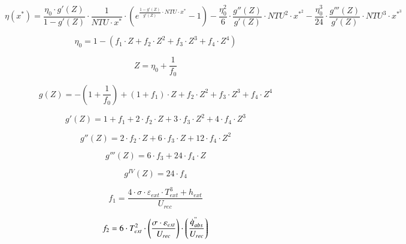 \documentclass[12pt]{report} %
\begin{document}
\begin{equation}
    \eta(x^{*}) = \frac{\eta_{0} \cdot g'(Z)}{1-g'(Z)} \cdot \frac{1}{NTU \cdot x^{*}} \cdot \left(e^{\frac{1-g'(Z)}{g'(Z)}\cdot NTU \cdot x^{*}} - 1\right) - \frac{\eta_{0}^2}{6} \cdot \frac{g''(Z)}{g'(Z)} \cdot NTU^{2} \cdot x^{*^{2}} - \frac{\eta_{0}^{3}}{24} \cdot \frac{g'''(Z)}{g'(Z)} \cdot NTU^{3} \cdot x^{*^{3}}
    \label{eq:modelocompleto}
\end{equation}

\begin{equation}
    \eta_{0} = 1 - (f_{1} \cdot Z + f_{2} \cdot Z^{2} + f_{3} \cdot Z^{3} + f_{4} \cdot Z^{4})
    \label{eq:rendimiento0}
\end{equation}

\begin{equation}
    Z = \eta_{0} + \frac{1}{f_{0}} 
    \label{eq:zeta}
\end{equation}

\begin{equation}
    g(Z) = -\left(1+\frac{1}{f_{0}}\right)+(1+f_{1})\cdot Z + f_{2}\cdot Z^{2} +  f_{3}\cdot Z^{3} + f_{4}\cdot Z^{4} 
    \label{eq:gdezeta}
\end{equation}

\begin{equation}
    g'(Z) = 1 + f_{1} + 2 \cdot f_{2} \cdot Z + 3 \cdot f_{3} \cdot Z^{2} + 4 \cdot f_{4} \cdot Z^{3} 
    \label{eq:gprimadezeta}
\end{equation}

\begin{equation}
    g''(Z) = 2 \cdot f_{2} \cdot Z + 6 \cdot f_{3} \cdot Z + 12 \cdot f_{4} \cdot Z^{2} 
    \label{eq:g2primadezeta}
\end{equation}

\begin{equation}
    g'''(Z) = 6 \cdot f_{3} + 24 \cdot f_{4} \cdot Z
    \label{eq:g3primadezeta}
\end{equation}

\begin{equation}
    g^{IV}(Z) = 24 \cdot f_{4}
    \label{eq:g4primadezeta}
\end{equation}

\begin{equation}
    f_{1} = \frac{4 \cdot \sigma \cdot \varepsilon_{ext} \cdot T_{ext}^{3} + h_{ext}}{U_{rec}}
    \label{eq:f1}
\end{equation}

\begin{equation}
    f_{2} = 6 \cdot T_{ext}^{2} \cdot \left(\frac{\sigma \cdot \varepsilon_{ext}}{U_{rec}} \right) \cdot \left(\frac{\dot{q}^{"}_{abs}}{U_{rec}}\right) 
    \label{eq:f2}
\end{equation}
\end{document}
